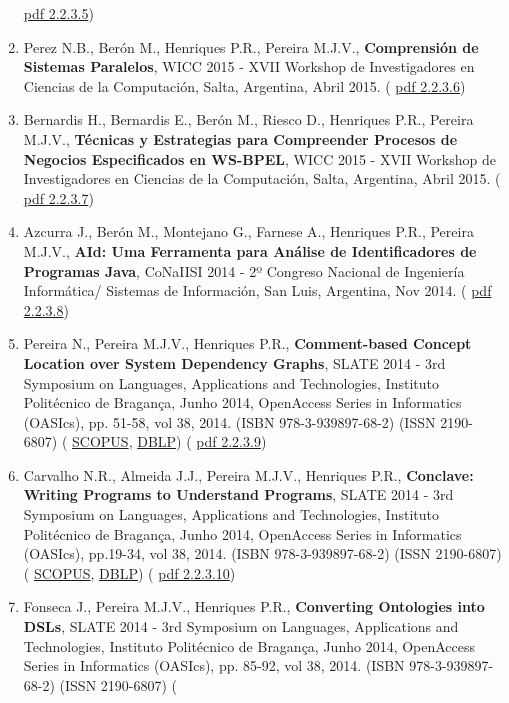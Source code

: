 \documentclass[11pt]{article}
\begin{document}
\begin{enumerate}
{\href{run:Publicacoes/publicacoes/87.pdf}{pdf 2.2.3.5})}
\item{Perez N.B., Berón M., Henriques P.R., Pereira M.J.V.,{
\bf{ Comprensión de Sistemas Paralelos}}, WICC 2015 - XVII Workshop de Investigadores en Ciencias de la Computación, Salta, Argentina, Abril 2015. (
\href{run:Publicacoes/publicacoes/80.pdf}{pdf 2.2.3.6})}
\item{Bernardis H., Bernardis E., Berón M., Riesco D., Henriques P.R., Pereira M.J.V., {
\bf{ Técnicas y Estrategias para Compreender Procesos de Negocios Especificados en WS-BPEL}}, WICC 2015 - XVII Workshop de Investigadores en Ciencias de la Computación, Salta, Argentina, Abril 2015. (
\href{run:Publicacoes/publicacoes/82.pdf}{pdf 2.2.3.7})}
\item{Azcurra J., Berón M., Montejano G., Farnese A., Henriques P.R., Pereira M.J.V., {
\bf{ AId: Uma Ferramenta para Análise de Identificadores de Programas Java}}, CoNaIISI 2014 - 2º Congreso Nacional de Ingeniería Informática/ Sistemas de Información, San Luis, Argentina, Nov 2014. (
\href{run:Publicacoes/publicacoes/77.pdf}{pdf 2.2.3.8})}
\item{Pereira N., Pereira M.J.V., Henriques P.R., {
\bf{ Comment-based Concept Location over System Dependency Graphs}}, SLATE 2014 - 3rd Symposium on Languages, Applications and Technologies, Instituto Politécnico de Bragança, Junho 2014, OpenAccess Series in Informatics (OASIcs), pp. 51-58, vol 38, 2014. (ISBN 978-3-939897-68-2) (ISSN 2190-6807) (
\href{run:Publicacoes/PublicacoesSCOPUS.pdf}{SCOPUS}, 
\href{run:Publicacoes/ComprovativosDBLP.pdf}{DBLP}) (
\href{run:Publicacoes/publicacoes/75.pdf}{pdf 2.2.3.9})}
\item{Carvalho N.R., Almeida J.J., Pereira M.J.V., Henriques P.R., {
\bf{ Conclave: Writing Programs to Understand Programs}}, SLATE 2014 - 3rd Symposium on Languages, Applications and Technologies, Instituto Politécnico de Bragança, Junho 2014, OpenAccess Series in Informatics (OASIcs),  pp.19-34, vol 38, 2014. (ISBN 978-3-939897-68-2) (ISSN 2190-6807) (
\href{run:Publicacoes/PublicacoesSCOPUS.pdf}{SCOPUS}, 
\href{run:Publicacoes/ComprovativosDBLP.pdf}{DBLP}) (
\href{run:Publicacoes/publicacoes/73.pdf}{pdf 2.2.3.10})}
\item{Fonseca J., Pereira M.J.V., Henriques P.R., {
\bf{ Converting Ontologies into DSLs}}, SLATE 2014 - 3rd Symposium on Languages, Applications and Technologies, Instituto Politécnico de Bragança, Junho 2014, OpenAccess Series in Informatics (OASIcs), pp. 85-92, vol 38, 2014. (ISBN 978-3-939897-68-2) (ISSN 2190-6807) (
}
\end{enumerate}
\end{document}
